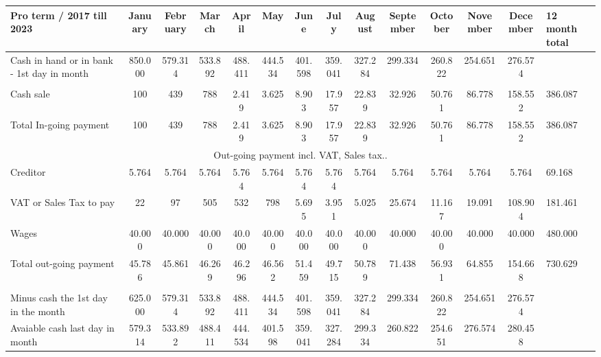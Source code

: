 \begin{tabular}{|p{3cm}|c|c|c|c|c|c|c|c|c|c|c|c|m{2cm}|}
\hline
\rowcolor[HTML]{9B9B9B} 
Pro term / 2017 till 2023 & January & February & March   & April   & May     & June    & July    & August  & September & October & November & December & 12 month total \\ \hline\hline
Cash in hand or in bank - 1st day in month   & 850.000 & 579.314  & 533.892 & 488.411 & 444.534 & 401.598 & 359.041 & 327.284 & 299.334   & 260.822 & 254.651  & 276.574  &                \\ \hline
\rowcolor[HTML]{9B9B9B} 
\multicolumn{14}{|c|}{\cellcolor[HTML]{9B9B9B}In-going payment incl. VAT, Sales tax ..}                                                                                                    \\ \hline
Cash sale                                    & 100     & 439      & 788     & 2.419   & 3.625   & 8.903   & 17.957  & 22.839  & 32.926    & 50.761  & 86.778   & 158.552  & 386.087        \\ \hline
\rowcolor[HTML]{9B9B9B} 
Total In-going payment                       & 100     & 439      & 788     & 2.419   & 3.625   & 8.903   & 17.957  & 22.839  & 32.926    & 50.761  & 86.778   & 158.552  & 386.087        \\ \hline
\multicolumn{14}{|c|}{Out-going payment incl. VAT, Sales tax..}                                                                                                                            \\ \hline
\rowcolor[HTML]{9B9B9B} 
Creditor                                     & 5.764   & 5.764    & 5.764   & 5.764   & 5.764   & 5.764   & 5.764   & 5.764   & 5.764     & 5.764   & 5.764    & 5.764    & 69.168         \\ \hline
VAT or Sales Tax to pay                      & 22      & 97       & 505     & 532     & 798     & 5.695   & 3.951   & 5.025   & 25.674    & 11.167  & 19.091   & 108.904  & 181.461        \\ \hline
\rowcolor[HTML]{9B9B9B} 
Wages                                        & 40.000  & 40.000   & 40.000  & 40.000  & 40.000  & 40.000  & 40.000  & 40.000  & 40.000    & 40.000  & 40.000   & 40.000   & 480.000        \\ \hline
Total out-going payment                      & 45.786  & 45.861   & 46.269  & 46.296  & 46.562  & 51.459  & 49.715  & 50.789  & 71.438    & 56.931  & 64.855   & 154.668  & 730.629        \\ \hline
\rowcolor[HTML]{9B9B9B} 
\multicolumn{14}{|c|}{\cellcolor[HTML]{9B9B9B}Change in avaible cash}                                                                                                                      \\ \hline
Minus cash the 1st day in the month          & 625.000 & 579.314  & 533.892 & 488.411 & 444.534 & 401.598 & 359.041 & 327.284 & 299.334   & 260.822 & 254.651  & 276.574  &                \\ \hline
\rowcolor[HTML]{9B9B9B} 
Avaiable cash last day in month              & 579.314 & 533.892  & 488.411 & 444.534 & 401.598 & 359.041 & 327.284 & 299.334 & 260.822   & 254.651 & 276.574  & 280.458  &                \\ \hline
\end{tabular}